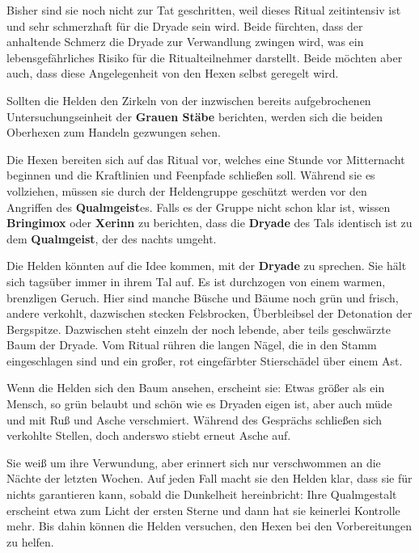 Bisher sind sie noch nicht zur Tat geschritten, weil dieses Ritual zeitintensiv ist und sehr schmerzhaft für die Dryade sein wird.
Beide fürchten, dass der anhaltende Schmerz die Dryade zur Verwandlung zwingen wird, was ein lebensgefährliches Risiko für die Ritualteilnehmer darstellt.
Beide möchten aber auch, dass diese Angelegenheit von den Hexen selbst geregelt wird.

Sollten die Helden den Zirkeln von der inzwischen bereits aufgebrochenen Untersuchungseinheit der \textbf{Grauen Stäbe} berichten, werden sich die beiden Oberhexen zum Handeln gezwungen sehen.

\spaltenende

\newpage
\spaltenanfang
{}
Die Hexen bereiten sich auf das Ritual vor, welches eine Stunde vor Mitternacht beginnen und die Kraftlinien und Feenpfade schließen soll.
Während sie es vollziehen, müssen sie durch der Heldengruppe geschützt werden vor den Angriffen des \textbf{Qualmgeist}es.
Falls es der Gruppe nicht schon klar ist, wissen \textbf{Bringimox} oder \textbf{Xerinn} zu berichten,
dass die \textbf{Dryade} des Tals identisch ist zu dem \textbf{Qualmgeist}, der des nachts umgeht.


Die Helden könnten auf die Idee kommen, mit der \textbf{Dryade} zu sprechen.
Sie hält sich tagsüber immer in ihrem Tal auf.
Es ist durchzogen von einem warmen, brenzligen Geruch.
Hier sind manche Büsche und Bäume noch grün und frisch, andere verkohlt, dazwischen stecken Felsbrocken, Überbleibsel der Detonation der Bergspitze.
Dazwischen steht einzeln der noch lebende, aber teils geschwärzte Baum der Dryade.
Vom Ritual rühren die langen Nägel, die in den Stamm eingeschlagen sind und ein großer, rot eingefärbter Stierschädel über einem Ast.

Wenn die Helden sich den Baum ansehen, erscheint sie:
Etwas größer als ein Mensch, so grün belaubt und schön wie es Dryaden eigen ist, aber auch müde und mit Ruß und Asche verschmiert.
Während des Gesprächs schließen sich verkohlte Stellen, doch anderswo stiebt erneut Asche auf.


Sie weiß um ihre Verwundung, aber erinnert sich nur verschwommen an die Nächte der letzten Wochen.
Auf jeden Fall macht sie den Helden klar, dass sie für nichts garantieren kann, sobald die Dunkelheit hereinbricht:
Ihre Qualmgestalt erscheint etwa zum Licht der ersten Sterne und dann hat sie keinerlei Kontrolle mehr.
Bis dahin können die Helden versuchen, den Hexen bei den Vorbereitungen zu helfen.


